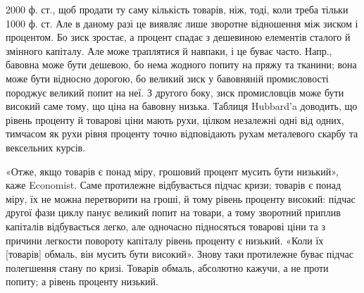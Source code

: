 2000 ф. ст., щоб продати ту саму кількість товарів, ніж, тоді, коли треба
тільки 1000 ф. ст. Але в даному разі це виявляє лише зворотне відношення
між зиском і процентом. Бо зиск зростає, а процент спадає з дешевиною елементів
сталого й змінного капіталу. Але може траплятися й навпаки, і це буває
часто. Напр., бавовна може бути дешевою, бо нема жодного попиту на
пряжу та тканини; вона може бути відносно дорогою, бо великий зиск у бавовняній
промисловості породжує великий попит на неї. З другого боку, зиск промисловців
може бути високий саме тому, що ціна на бавовну низька. Таблиця
Hubbard’a доводить, що рівень проценту й товарові ціни мають рухи, цілком незалежні
одні від одних, тимчасом як рухи рівня проценту точно відповідають
рухам металевого скарбу та вексельних курсів.

«Отже, якщо товарів є понад міру, грошовий процент мусить бути низький»,
каже Economist. Саме протилежне відбувається підчас кризи; товарів є понад міру, їх
не можна перетворити на гроші, й тому рівень проценту високий: підчас другої фази
циклу панує великий попит на товари, а тому зворотний приплив капіталів відбувається
легко, але одночасно підносяться товарові ціни та з причини легкости повороту
капіталу рівень проценту є низький. «Коли їх [товарів] обмаль, він мусить
бути високий». Знову таки протилежне буває підчас полегшення стану по кризі. Товарів
обмаль, абсолютно кажучи, а не проти попиту; а рівень проценту низький.
